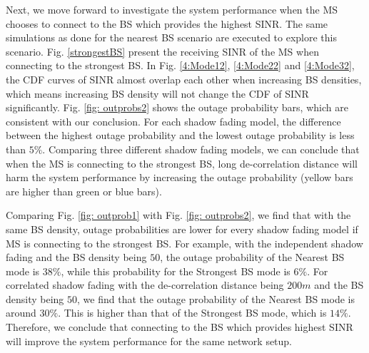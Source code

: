 \documentclass[journal,10pt]{IEEEtran}
\begin{document}
 \par Next, we move forward to investigate the system performance when the MS chooses to connect to the BS which provides the highest SINR. The same simulations as done for the nearest BS scenario are executed to explore this scenario. Fig. \ref{strongestBS} present the receiving SINR of the MS when connecting to the strongest BS. In Fig. \ref{4:Mode12}, \ref{4:Mode22} and \ref{4:Mode32}, the CDF curves of SINR almost overlap each other when increasing BS densities, which means increasing BS density will not change the CDF of SINR significantly. Fig. \ref{fig: outprobs2} shows the outage probability bars, which are consistent with our conclusion. For each shadow fading model, the difference between the highest outage probability and the lowest outage probability is less than $5\%$. Comparing three different shadow fading models, we can conclude that when the MS is connecting to the strongest BS, long de-correlation distance will harm the system performance by increasing the outage probability (yellow bars are higher than green or blue bars). 
 \par Comparing Fig. \ref{fig: outprob1} with Fig. \ref{fig: outprobs2}, we find that with the same BS density, outage probabilities are lower for every shadow fading model if MS is connecting to the strongest BS. For example, with the independent shadow fading and the BS density being $50$, the outage probability of the Nearest BS mode is $38\%$, while this probability for the Strongest BS mode is $6\%$. For correlated shadow fading with the de-correlation distance being $200m$ and the BS density being $50$, we find that the outage probability of the Nearest BS mode is around $30\%$. This is higher than that of the Strongest BS mode, which is $14\%$. Therefore, we conclude that connecting to the BS which provides highest SINR will improve the system performance for the same network setup. 
\end{document}
